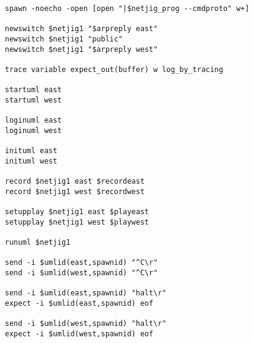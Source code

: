 \begin{verbatim}
spawn -noecho -open [open "|$netjig_prog --cmdproto" w+]

newswitch $netjig1 "$arpreply east"
newswitch $netjig1 "public"
newswitch $netjig1 "$arpreply west"

trace variable expect_out(buffer) w log_by_tracing

startuml east 
startuml west

loginuml east
loginuml west

inituml east
inituml west

record $netjig1 east $recordeast
record $netjig1 west $recordwest

setupplay $netjig1 east $playeast
setupplay $netjig1 west $playwest

runuml $netjig1

send -i $umlid(east,spawnid) "^C\r"
send -i $umlid(west,spawnid) "^C\r"

send -i $umlid(east,spawnid) "halt\r"
expect -i $umlid(east,spawnid) eof

send -i $umlid(west,spawnid) "halt\r"
expect -i $umlid(west,spawnid) eof
\end{verbatim}







